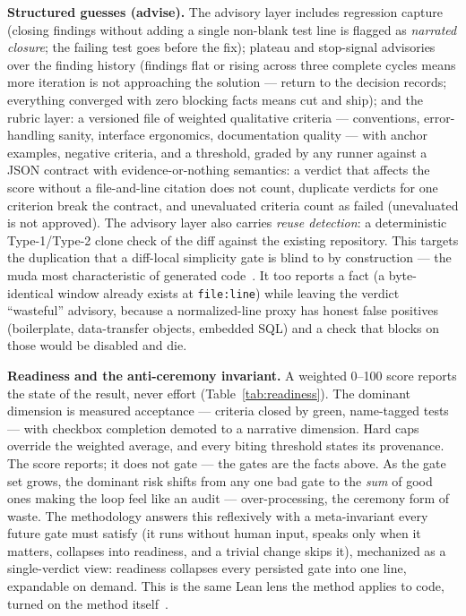 \documentclass[11pt]{article}
\begin{document}
\textbf{Structured guesses (advise).} The advisory layer includes regression
capture (closing findings without adding a single non-blank test line is
flagged as \emph{narrated closure}; the failing test goes before the fix);
plateau and stop-signal advisories over the finding history (findings flat or
rising across three complete cycles means more iteration is not approaching
the solution --- return to the decision records; everything converged with
zero blocking facts means cut and ship); and the rubric layer: a versioned
file of weighted qualitative criteria --- conventions, error-handling sanity,
interface ergonomics, documentation quality --- with anchor examples, negative
criteria, and a threshold, graded by any runner against a JSON contract with
evidence-or-nothing semantics: a verdict that affects the score without a
file-and-line citation does not count, duplicate verdicts for one criterion
break the contract, and unevaluated criteria count as failed (unevaluated is
not approved). The advisory layer also carries \emph{reuse detection}: a
deterministic Type-1/Type-2 clone check of the diff against the existing
repository. This targets the duplication that a diff-local simplicity gate is
blind to by construction --- the muda most characteristic of generated
code~\cite{poppendieck2006lean,gitclear2026gap}. It too reports a fact (a
byte-identical window already exists at \texttt{file:line}) while leaving the
verdict ``wasteful'' advisory, because a normalized-line proxy has honest false
positives (boilerplate, data-transfer objects, embedded SQL) and a check that
blocks on those would be disabled and die.

\textbf{Readiness and the anti-ceremony invariant.} A weighted 0--100 score
reports the state of the result, never effort (Table~\ref{tab:readiness}). The
dominant dimension is measured acceptance --- criteria closed by green,
name-tagged tests --- with checkbox completion demoted to a narrative
dimension. Hard caps override the weighted average, and every biting threshold
states its provenance. The score reports; it does not gate --- the gates are
the facts above. As the gate set grows, the dominant risk shifts from any one
bad gate to the \emph{sum} of good ones making the loop feel like an audit ---
over-processing, the ceremony form of waste. The methodology answers this
reflexively with a meta-invariant every future gate must satisfy (it runs
without human input, speaks only when it matters, collapses into readiness, and
a trivial change skips it), mechanized as a single-verdict view: readiness
collapses every persisted gate into one line, expandable on demand. This is the
same Lean lens the method applies to code, turned on the method
itself~\cite{poppendieck2006lean}.
\end{document}

